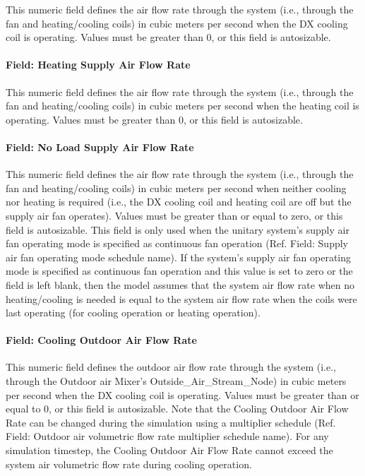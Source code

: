 This numeric field defines the air flow rate through the system (i.e., through the fan and heating/cooling coils) in cubic meters per second when the DX cooling coil is operating. Values must be greater than 0, or this field is autosizable.

\paragraph{Field: Heating Supply Air Flow Rate}\label{field-heating-supply-air-flow-rate-6}

This numeric field defines the air flow rate through the system (i.e., through the fan and heating/cooling coils) in cubic meters per second when the heating coil is operating. Values must be greater than 0, or this field is autosizable.

\paragraph{Field: No Load Supply Air Flow Rate}\label{field-no-load-supply-air-flow-rate-5}

This numeric field defines the air flow rate through the system (i.e., through the fan and heating/cooling coils) in cubic meters per second when neither cooling nor heating is required (i.e., the DX cooling coil and heating coil are off but the supply air fan operates). Values must be greater than or equal to zero, or this field is autosizable. This field is only used when the unitary system's supply air fan operating mode is specified as continuous fan operation (Ref. Field: Supply air fan operating mode schedule name). If the system's supply air fan operating mode is specified as continuous fan operation and this value is set to zero or the field is left blank, then the model assumes that the system air flow rate when no heating/cooling is needed is equal to the system air flow rate when the coils were last operating (for cooling operation or heating operation).

\paragraph{Field: Cooling Outdoor Air Flow Rate}\label{field-cooling-outdoor-air-flow-rate-000}

This numeric field defines the outdoor air flow rate through the system (i.e., through the Outdoor air Mixer's Outside\_Air\_Stream\_Node) in cubic meters per second when the DX cooling coil is operating. Values must be greater than or equal to 0, or this field is autosizable. Note that the Cooling Outdoor Air Flow Rate can be changed during the simulation using a multiplier schedule (Ref. Field: Outdoor air volumetric flow rate multiplier schedule name). For any simulation timestep, the Cooling Outdoor Air Flow Rate cannot exceed the system air volumetric flow rate during cooling operation.


